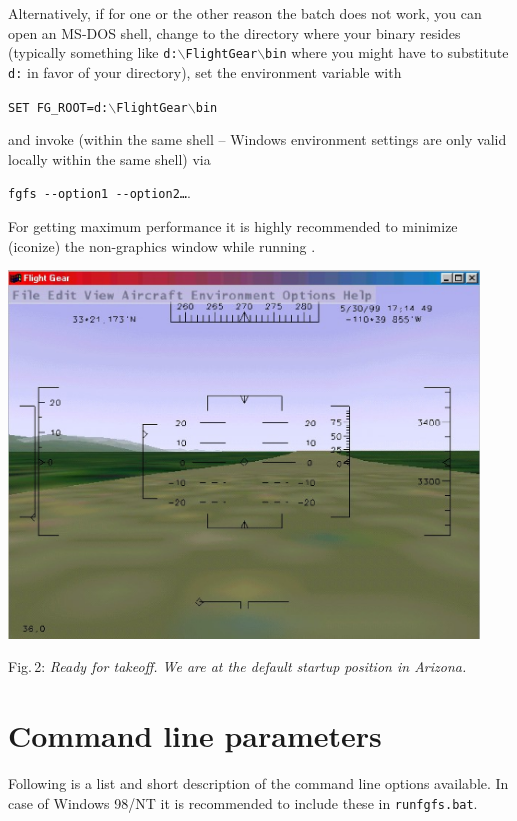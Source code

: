 Alternatively, if for one or the other reason the batch does not work, you can open an
MS-DOS shell, change to the directory where your binary resides (typically something like
\texttt{d:$\backslash$FlightGear$\backslash$bin} where you might have to substitute
\texttt{d:} in favor of your \FlightGear directory), set the environment variable with

\texttt{SET FG\_ROOT=d:$\backslash$FlightGear$\backslash$bin}

\noindent
 and invoke \FlightGear (within the same shell -- Windows environment
 settings are only valid locally within the same shell) via

\texttt{fgfs -$\!$-option1 -$\!$-option2\dots}.

For getting maximum performance it is highly recommended to
minimize (iconize) the non-graphics window while running
{\FlightGear}$\!$.
 \medskip

 \centerline{
\includegraphics[clip,width=12.5cm]{arizona.eps}
}

\smallskip
 \noindent
Fig.\,2: \textit{Ready for takeoff. We are at the default startup
position in Arizona.}
\medskip

\section{Command line parameters\label{options}}

Following is a list and short description of the command line options available. In case
of Windows 98/NT it is recommended to include these in \texttt{runfgfs.bat}.

